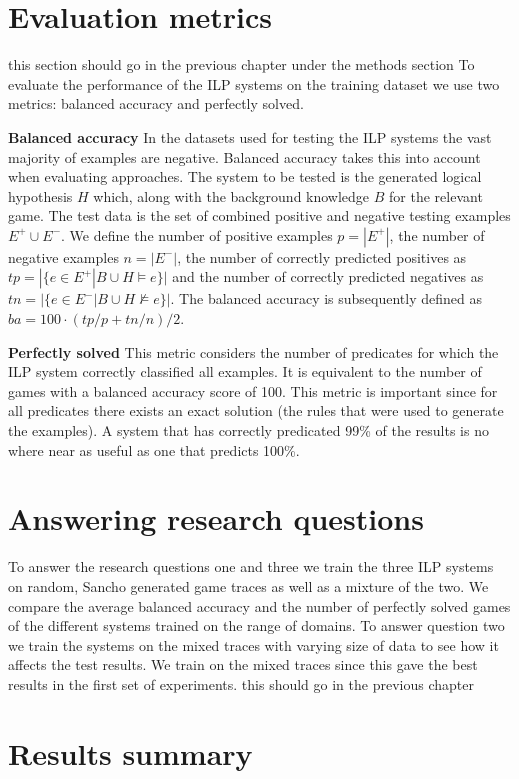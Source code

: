 \section{Evaluation metrics}
\ac{this section should go in the previous chapter under the methods section}
To evaluate the performance of the ILP systems on the training dataset we use two metrics: balanced accuracy and perfectly solved.

\textbf{Balanced accuracy} In the datasets used for testing the ILP systems the vast majority of examples are negative. Balanced accuracy takes this into account when evaluating approaches. The system to be tested is the generated logical hypothesis $H$ which, along with the background knowledge $B$ for the relevant game. The test data is the set of combined positive and negative testing examples $E^+ \cup E^-$. We define the number of positive examples $p = |E^+|$, the number of negative examples $n = |E^-|$, the number of correctly predicted positives as $tp = |\{e\in E^+|B\cup H \models e\}|$ and the number of correctly predicted negatives as $tn = |\{e\in E^-|B\cup H \not\models e\}|$. The balanced accuracy is subsequently defined as $ba = 100 \cdot (tp/p + tn/n)/2$.

\textbf{Perfectly solved} This metric considers the number of predicates for which the ILP system correctly classified all examples. It is equivalent to the number of games with a balanced accuracy score of 100. This metric is important since for all predicates there exists an exact solution (the rules that were used to generate the examples). A system that has correctly predicated 99\% of the results is no where near as useful as one that predicts 100\%.

\section{Answering research questions}
To answer the research questions one and three we train the three ILP systems on random, Sancho generated game traces as well as a mixture of the two. We compare the average balanced accuracy and the number of perfectly solved games of the different systems trained on the range of domains.
To answer question two we train the systems on the mixed traces with varying size of data to see how it affects the test results. We train on the mixed traces since this gave the best results in the first set of experiments.
\ac{this should go in the previous chapter}

\section{Results summary}


